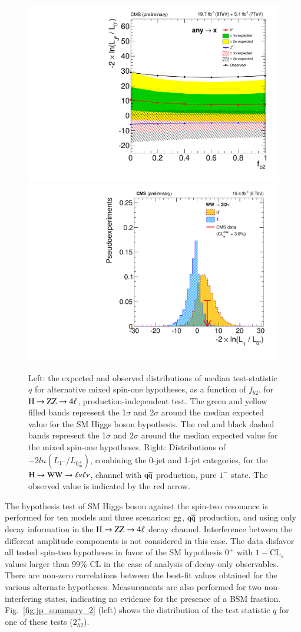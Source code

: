 \begin{figure}[!htbp]
  \begin{center}
\centerline{
\includegraphics[width=0.49\linewidth]{figures/hzz_spin1_summary_PI.pdf}
\includegraphics[width=0.52\linewidth]{figures/hzww_spin1_q1minus.pdf}
}
\caption{Left: the expected and observed distributions of median
  test-statistic $q$ for alternative mixed spin-one hypotheses, as
  a function of $f_{b2}$, for $\mathrm{H}\to\mathrm{Z}\mathrm{Z}\to4\ell$, production-independent
  test.  The green and yellow filled bands represent the 1$\sigma$
  and 2$\sigma$ around the median expected value for the SM Higgs
  boson hypothesis. The red and black dashed bands represent the
  1$\sigma$ and 2$\sigma$ around the median expected value for the
  mixed spin-one hypotheses.  Right: Distributions of $-2
  ln(L_{1^-} /L_{0^{+}_{m}})$, combining the 0-jet and 1-jet
  categories, for the $\mathrm{H}\to\mathrm{W}\mathrm{W}\to\ell\nu\ell\nu$, channel with $\mathrm{\mathrm{q}\mathrm{\overline{q}}}$
  production, pure $1^-$ state. The observed value is indicated by
  the red arrow.
  \label{fig:jp_summary_1}} 
  \end{center}
\end{figure}

The hypothesis test of SM Higgs boson against the spin-two resonance
is performed for ten models and three scenarios: $\mathrm{g}\mathrm{g}$, $\mathrm{\mathrm{q}\mathrm{\overline{q}}}$
production, and using only decay information in the $\mathrm{H}\to\mathrm{Z}\mathrm{Z}\to4\ell$ decay
channel. Interference between the different amplitude components is
not considered in this case. The data disfavor all tested spin-two
hypotheses in favor of the SM hypothesis $0^+$ with $1-$CL$_s$ values
larger than 99\% CL in the case of analysis of decay-only observables.
There are non-zero correlations between the best-fit values obtained
for the various alternate hypotheses.  Measurements are also performed
for two non-interfering states, indicating no evidence for the
presence of a BSM fraction. Fig.~\ref{fig:jp_summary_2} (left) shows
the distribution of the test statistic $q$ for one of these tests
($2_{h2}^+$).

